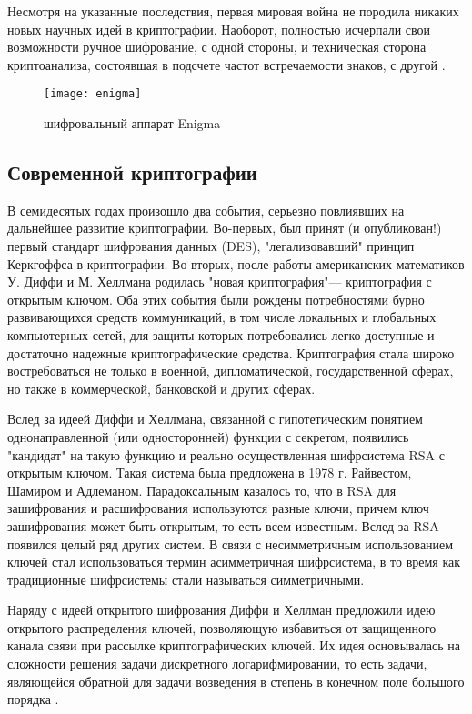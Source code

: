 Несмотря на указанные последствия, первая мировая война не породила никаких новых научных идей в криптографии. Наоборот, полностью исчерпали свои возможности ручное шифрование, с одной стороны, и техническая сторона криптоанализа, состоявшая в подсчете частот встречаемости знаков, с другой \cite{g2005n}.

\begin{figure}[H]
	\texttt{[image: enigma]}
	\centering
	\caption{шифровальный аппарат Enigma \cite{hodges2014alan}}
\end{figure}



\subsection{Современной криптографии}

В семидесятых годах произошло два события, серьезно повлиявших на дальнейшее развитие криптографии. Во-первых, был принят (и опубликован!) первый стандарт шифрования данных (DES), "легализовавший" принцип Керкгоффса в криптографии. Во-вторых, после работы американ­ских математиков У. Диффи и М. Хеллмана родилась "новая криптография"— криптография с открытым клю­чом. Оба этих события были рождены потребностями бурно развивающихся средств коммуникаций, в том числе локаль­ных и глобальных компьютерных сетей, для защиты которых потребовались легко доступные и достаточно надежные крип­тографические средства. Криптография стала широко востребоваться не только в военной, дипломатической, государст­венной сферах, но также в коммерческой, банковской и дру­гих сферах.

Вслед за идеей Диффи и Хеллмана, связанной с гипотетическим понятием однонаправленной (или односторонней) функции с секретом, появились "кандидат" на такую функ­цию и реально осуществленная шифрсистема RSA с откры­тым ключом. Такая система была предложена в 1978 г. Райвестом, Шамиром и Адлеманом. Парадоксальным казалось то, что в RSA для зашифрования и расшифрования используются разные ключи, причем ключ зашифрования может быть от­крытым, то есть всем известным. Вслед за RSA появился целый ряд других систем. В связи с несимметричным исполь­зованием ключей стал использоваться термин асимметричная шифрсистема, в то время как традиционные шифрсистемы стали называться симметричными.

Наряду с идеей открытого шифрования Диффи и Хеллман предложили идею открытого распределения ключей, позво­ляющую избавиться от защищенного канала связи при рас­сылке криптографических ключей. Их идея основывалась на сложности решения задачи дискретного логарифмировании, то есть задачи, являющейся обратной для задачи возведения в степень в конечном поле большого порядка \cite{bellare2005introduction}.

